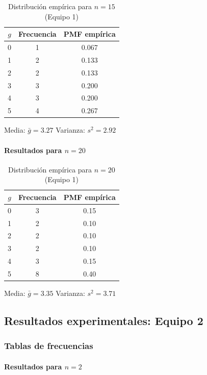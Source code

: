 \begin{table}[H]
\centering
\begin{tabular}{ccc}
\toprule
\(g\) & Frecuencia & PMF empírica \\
\midrule
0 & 1 & 0.067 \\
1 & 2 & 0.133 \\
2 & 2 & 0.133 \\
3 & 3 & 0.200 \\
4 & 3 & 0.200 \\
5 & 4 & 0.267 \\
\bottomrule
\end{tabular}
\caption{Distribución empírica para \(n=15\) (Equipo 1)}
\end{table}

Media: \(\bar{g}=3.27\) \quad Varianza: \(s^2=2.92\)

\paragraph{\texorpdfstring{Resultados para \(n=20\)}{Resultados para n=20}}

\begin{table}[H]
\centering
\begin{tabular}{ccc}
\toprule
\(g\) & Frecuencia & PMF empírica \\
\midrule
0 & 3 & 0.15 \\
1 & 2 & 0.10 \\
2 & 2 & 0.10 \\
3 & 2 & 0.10 \\
4 & 3 & 0.15 \\
5 & 8 & 0.40 \\
\bottomrule
\end{tabular}
\caption{Distribución empírica para \(n=20\) (Equipo 1)}
\end{table}

Media: \(\bar{g}=3.35\) \quad Varianza: \(s^2=3.71\)

\subsection{Resultados experimentales: Equipo 2}

\subsubsection{Tablas de frecuencias}

\paragraph{\texorpdfstring{Resultados para \(n=2\)}{Resultados para n=2}}

